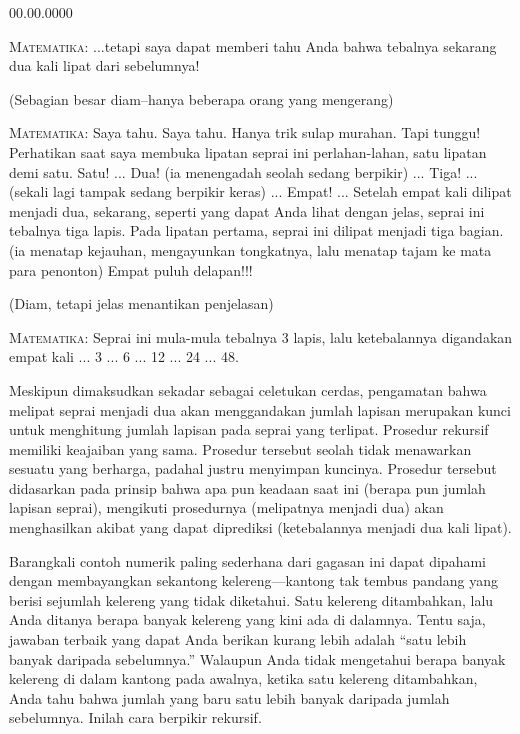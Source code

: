 \begin{lyxlist}{00.00.0000}
\item [{\textsc{Pesulap}}] \textsc{Matematika:} ...tetapi saya dapat memberi
tahu Anda bahwa tebalnya sekarang dua kali lipat dari sebelumnya!
\item [{\textsc{Penonton:}}] (Sebagian besar diam--hanya beberapa orang
yang mengerang)
\item [{\textsc{Pesulap}}] \textsc{Matematika:} Saya tahu. Saya tahu. Hanya
trik sulap murahan. Tapi tunggu! Perhatikan saat saya membuka lipatan
seprai ini perlahan-lahan, satu lipatan demi satu. Satu! ... Dua!
(ia menengadah seolah sedang berpikir) ... Tiga! ... (sekali lagi
tampak sedang berpikir keras) ... Empat! ... Setelah empat kali dilipat
menjadi dua, sekarang, seperti yang dapat Anda lihat dengan jelas,
seprai ini tebalnya tiga lapis. Pada lipatan pertama, seprai ini dilipat
menjadi tiga bagian. (ia menatap kejauhan, mengayunkan tongkatnya,
lalu menatap tajam ke mata para penonton) Empat puluh delapan!!!
\item [{\textsc{Penonton:}}] (Diam, tetapi jelas menantikan penjelasan)
\item [{\textsc{Pesulap}}] \textsc{Matematika:} Seprai ini mula-mula tebalnya
3 lapis, lalu ketebalannya digandakan empat kali ... 3 ... 6 ... 12
... 24 ... 48.
\end{lyxlist}
Meskipun dimaksudkan sekadar sebagai celetukan cerdas, pengamatan
bahwa melipat seprai menjadi dua akan menggandakan jumlah lapisan
merupakan kunci untuk menghitung jumlah lapisan pada seprai yang terlipat.
Prosedur rekursif memiliki keajaiban yang sama. Prosedur tersebut
seolah tidak menawarkan sesuatu yang berharga, padahal justru menyimpan
kuncinya. Prosedur tersebut didasarkan pada prinsip bahwa apa pun
keadaan saat ini (berapa pun jumlah lapisan seprai), mengikuti prosedurnya
(melipatnya menjadi dua) akan menghasilkan akibat yang dapat diprediksi
(ketebalannya menjadi dua kali lipat). 

Barangkali contoh numerik paling sederhana dari gagasan ini dapat
dipahami dengan membayangkan sekantong kelereng---kantong tak tembus
pandang yang berisi sejumlah kelereng yang tidak diketahui. Satu kelereng
ditambahkan, lalu Anda ditanya berapa banyak kelereng yang kini ada
di dalamnya. Tentu saja, jawaban terbaik yang dapat Anda berikan kurang
lebih adalah ``satu lebih banyak daripada sebelumnya.'' Walaupun
Anda tidak mengetahui berapa banyak kelereng di dalam kantong pada
awalnya, ketika satu kelereng ditambahkan, Anda tahu bahwa jumlah
yang baru satu lebih banyak daripada jumlah sebelumnya. Inilah cara
berpikir rekursif.

